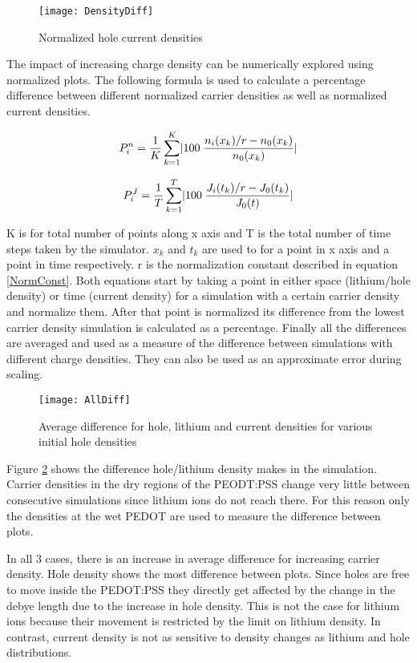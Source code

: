 \begin{doublespace}
\begin{figure}[!htp]
\centering
\texttt{[image: DensityDiff]}
\caption{Normalized hole current densities} 
\label{DensityDiff}
\end{figure}

The impact of increasing charge density can be numerically explored using normalized plots. The following formula is used to calculate a percentage difference between different normalized carrier densities as well as normalized current densities. 

\begin{equation}
\centering
P_i^{n} = \frac{1}{ K}\sum_{k=1}^{K}\lvert 100 \;\frac{n_{i}(x_k)/r-n_{0}(x_k)}{n_{0}(x_k)}\rvert
\end{equation}

\begin{equation}
\centering
P_i^{J} = \frac{1}{ T}\sum_{k=1}^{T}\lvert 100 \;\frac{J_{i}(t_k)/r-J_{0}(t_k)}{J_{0}(t)}\rvert
\end{equation}

K is for total number of points along x axis and T is the total number of time steps taken by the simulator. $x_{k}$ and $t_{k}$ are used to for a point in x axis and a point in time respectively. r is the normalization constant described in equation \ref{NormConst}. Both equations start by taking a point in either space (lithium/hole density) or time (current density) for a simulation with a certain carrier density and normalize them. After that point is normalized its difference from the lowest carrier density simulation is calculated as a percentage. Finally all the differences are averaged and used as a measure of the difference between simulations with different charge densities. They can also be used as an approximate error during scaling. 

\begin{figure}[!htp]
\centering
\texttt{[image: AllDiff]}
\caption{Average difference for hole, lithium and current densities for various initial hole densities} 
\label{AllDiff}
\end{figure}

Figure \ref{AllDiff} shows the difference hole/lithium density makes in the simulation. Carrier densities in the dry regions of the PEODT:PSS change very little between consecutive simulations since lithium ions do not reach there. For this reason only the densities at the wet PEDOT are used to measure the difference between plots. 

In all 3 cases, there is an increase in average difference for increasing carrier density. Hole density shows the most difference between plots. Since holes are free to move inside the PEDOT:PSS they directly get affected by the change in the debye length due to the increase in hole density. This is not the case for lithium ions because their movement is restricted by the limit on lithium density. In contrast, current density is not as sensitive to density changes as lithium and hole distributions.


\end{doublespace}
